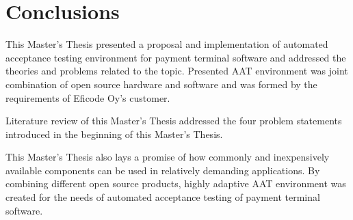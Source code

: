 
\chapter{Conclusions}
\label{chapter:conclusions}

This Master's Thesis presented a proposal and implementation of automated acceptance testing environment for payment terminal software and addressed the theories and problems related to the topic. Presented AAT environment was joint combination of open source hardware and software and was formed by the requirements of Eficode Oy's customer.

Literature review of this Master's Thesis addressed the four problem statements introduced in the beginning of this Master's Thesis.

This Master's Thesis also lays a promise of how commonly and inexpensively available components can be used in relatively demanding applications. By combining different open source products, highly adaptive AAT environment was created for the needs of automated acceptance testing of payment terminal software.
